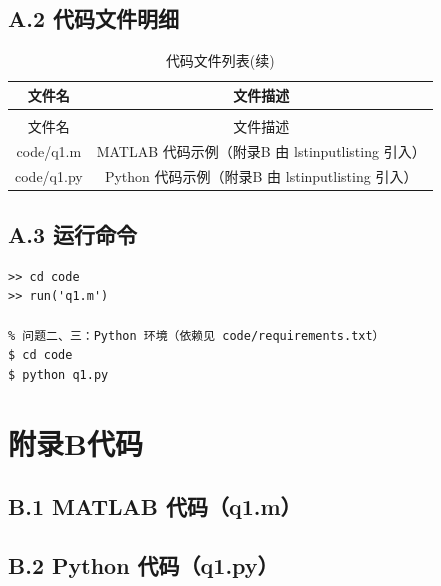 \documentclass{MathorCupmodeling}
\begin{document}
\subsection*{A.2 代码文件明细}
\begin{longtable}{cc}
	\caption{代码文件列表}
	\label{tab:codefile}\\
	\toprule[1.5pt]
	文件名 & 文件描述 \\
	\midrule
	\endfirsthead
	\caption[]{代码文件列表(续)}\\
	\toprule[1.5pt]
	文件名 & 文件描述 \\
	\midrule
	\endhead
	\bottomrule[1.5pt]
	\endfoot
	code/q1.m & MATLAB 代码示例（附录B 由 lstinputlisting 引入） \\
	code/q1.py & Python 代码示例（附录B 由 lstinputlisting 引入） \\
\end{longtable}

\subsection*{A.3 运行命令}
\begin{lstlisting}[frame=single,numbers=none]
% 问题一：MATLAB 环境
>> cd code
>> run('q1.m')

% 问题二、三：Python 环境（依赖见 code/requirements.txt）
$ cd code
$ python q1.py
\end{lstlisting}

\section*{附录B代码}

\subsection*{B.1 MATLAB 代码（q1.m）}


\subsection*{B.2 Python 代码（q1.py）}

\end{document}
